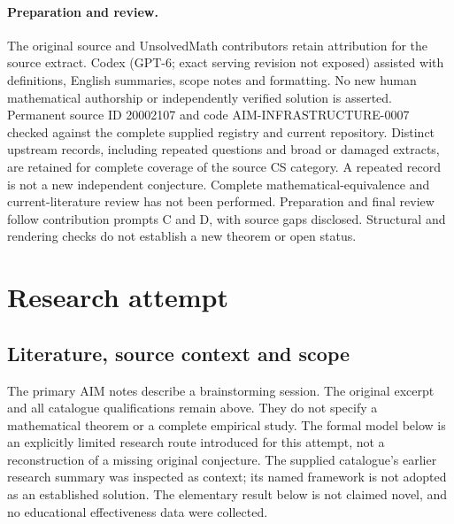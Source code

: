 \documentclass[11pt]{article}
\begin{document}
\paragraph{Preparation and review.}
The original source and UnsolvedMath contributors retain attribution for the source extract. Codex (GPT-6; exact serving revision not exposed) assisted with definitions, English summaries, scope notes and formatting. No new human mathematical authorship or independently verified solution is asserted. Permanent source ID 20002107 and code AIM-INFRASTRUCTURE-0007 checked against the complete supplied registry and current repository. Distinct upstream records, including repeated questions and broad or damaged extracts, are retained for complete coverage of the source CS category. A repeated record is not a new independent conjecture. Complete mathematical-equivalence and current-literature review has not been performed. Preparation and final review follow contribution prompts C and D, with source gaps disclosed. Structural and rendering checks do not establish a new theorem or open status.
\label{end:20002107}

\section{Research attempt}
\subsection{Literature, source context and scope}
The primary AIM notes describe a brainstorming session. The original excerpt and all catalogue qualifications remain above. They do not specify a mathematical theorem or a complete empirical study. The formal model below is an explicitly limited research route introduced for this attempt, not a reconstruction of a missing original conjecture. The supplied catalogue's earlier research summary was inspected as context; its named framework is not adopted as an established solution. The elementary result below is not claimed novel, and no educational effectiveness data were collected.
\end{document}
